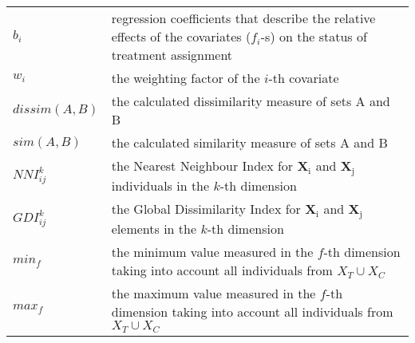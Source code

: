 \begin{tabular}{lp{10cm}}
	$b_i$                  & regression coefficients that describe the relative effects of the covariates ($f_i$-s) on the status of treatment assignment      \\
    	$w_i$                          & the weighting factor of the $i$-th covariate                                                                 \\
	$dissim(A,B)$ & the calculated dissimilarity measure of sets A and B                                                                            \\
	$sim(A, B)$   & the calculated similarity measure of sets A and B                                                                               \\
	$NNI_{ij}^{k}$         & the Nearest Neighbour Index for $\bm{\mathrm{\textbf{X}_i}}$ and $\bm{\mathrm{\textbf{X}_j}}$ individuals in the $k$-th dimension \\
	$GDI_{ij}^{k}$         & the Global Dissimilarity Index for $\bm{\mathrm{\textbf{X}_i}}$ and $\bm{\mathrm{\textbf{X}_j}}$ elements in the $k$-th dimension \\
	$min_f$                & the minimum value measured in the $f$-th dimension taking into account all individuals from ${X_T \cup X_C}$                      \\
	$max_f$                & the maximum value measured in the $f$-th dimension taking into account all individuals from ${X_T \cup X_C}$                      \\
	
\end{tabular}

